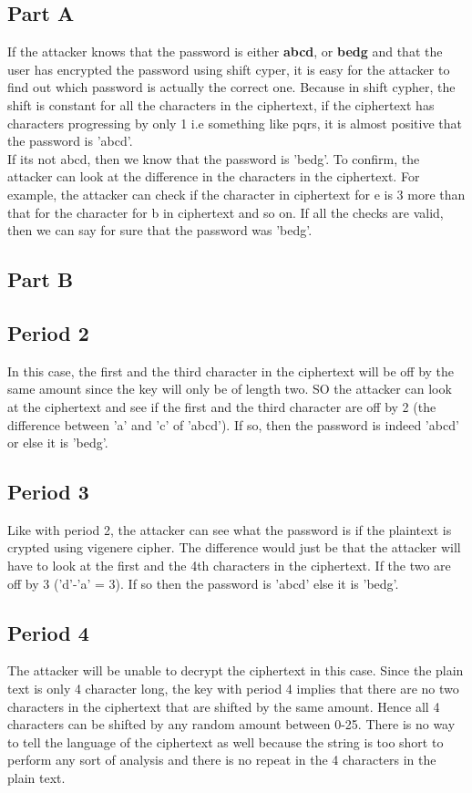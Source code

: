 \documentclass{article}
\newcommand\tab[1][1cm]{\hspace*{#1}}
\begin{document}
        \subsection*{Part A}
            \tab If the attacker knows that the password is either \textbf{abcd}, or \textbf{bedg} and that the user has encrypted the password using shift cyper, it is easy for the attacker to find out which password is actually the correct one. Because in shift cypher, the shift is constant for all the characters in the ciphertext, if the ciphertext has characters progressing by only 1 i.e something like pqrs, it is almost positive that the password is 'abcd'.\\
            \tab If its not abcd, then we know that the password is 'bedg'. To confirm, the attacker can look at the difference in the characters in the ciphertext. For example, the attacker can check if the character in ciphertext for e is 3 more than that for the character for b in ciphertext and so on. If all the checks are valid, then we can say for sure that the password was 'bedg'.\\
        \subsection*{Part B}
            \subsection*{Period 2}
                \tab In this case, the first and the third character in the ciphertext will be off by the same amount since the key will only be of length two. SO the attacker can look at the ciphertext and see if the first and the third character are off by 2 (the difference between 'a' and 'c' of 'abcd'). If so, then the password is indeed 'abcd' or else it is 'bedg'.
            \subsection*{Period 3}
                \tab Like with period 2, the attacker can see what the password is if the plaintext is crypted using vigenere cipher. The difference would just be that the attacker will have to look at the first and the 4th characters in the ciphertext. If the two are off by 3 ('d'-'a' = 3). If so then the password is 'abcd' else it is 'bedg'.
            \subsection*{Period 4}
                \tab The attacker will be unable to decrypt the ciphertext in this case. Since the plain text is only 4 character long, the key with period 4 implies that there are no two characters in the ciphertext that are shifted by the same amount. Hence all 4 characters can be shifted by any random amount between 0-25. There is no way to tell the language of the ciphertext as well because the string is too short to perform any sort of analysis and there is no repeat in the 4 characters in the plain text.
\end{document}
